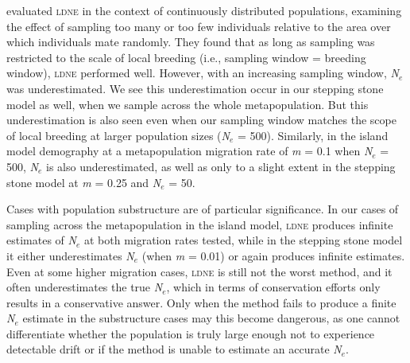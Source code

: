 \citet{Neel:2013} evaluated \textsc{ldne} in the context of continuously distributed populations, 
examining the effect of sampling too many or too few individuals relative to the area over which 
individuals mate randomly. They found that as long as sampling was restricted to the scale of local 
breeding (i.e., sampling window = breeding window), \textsc{ldne} performed well. However, with an 
increasing sampling window, \emph{N}$_e$ was underestimated. We see this underestimation occur in 
our stepping stone model as well, when we sample across the whole metapopulation. But this 
underestimation is also seen even when our sampling window matches the scope of local breeding 
at larger population sizes (\emph{N}$_e$ = 500). Similarly, in the island model demography at 
a metapopulation migration rate of \emph{m} = 0.1 when \emph{N}$_e$ = 500, \emph{N}$_e$ is also 
underestimated, as well as only to a slight extent in the stepping stone model at \emph{m} = 0.25 and \emph{N}$_e$ = 50.

Cases with population substructure are of particular significance. In our cases of sampling across 
the metapopulation in the island model, \textsc{ldne} produces infinite estimates of \emph{N}$_e$ at 
both migration rates tested, while in the stepping stone model it either underestimates \emph{N}$_e$ 
(when \emph{m} = 0.01) or again produces infinite estimates. Even at some higher migration cases, \textsc{ldne} 
is still not the worst method, and it often underestimates the true \emph{N}$_e$, which in terms of 
conservation efforts only results in a conservative answer. Only when the method fails to produce a 
finite \emph{N}$_e$ estimate in the substructure cases may this become dangerous, as one cannot 
differentiate whether the population is truly large enough not to experience detectable drift or if 
the method is unable to estimate an accurate \emph{N}$_e$.

